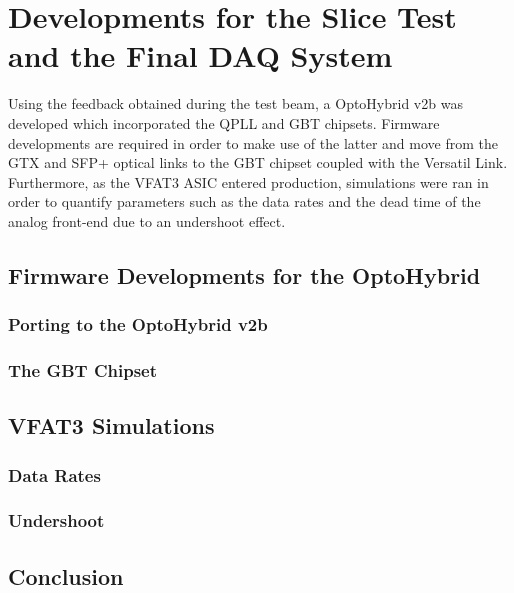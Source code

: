 \chapter{Developments for the Slice Test and the Final DAQ System}
\label{chap:II-4-slice-test}

  Using the feedback obtained during the test beam, a OptoHybrid v2b was developed which incorporated the QPLL and GBT chipsets. Firmware developments are required in order to make use of the latter and move from the GTX and SFP+ optical links to the GBT chipset coupled with the Versatil Link. \\

  Furthermore, as the VFAT3 ASIC entered production, simulations were ran in order to quantify parameters such as the data rates and the dead time of the analog front-end due to an undershoot effect. 

  \section{Firmware Developments for the OptoHybrid}

    \subsection{Porting to the OptoHybrid v2b}

    \subsection{The GBT Chipset}

  \section{VFAT3 Simulations}

    \subsection{Data Rates}

    \subsection{Undershoot}

  \section{Conclusion}
